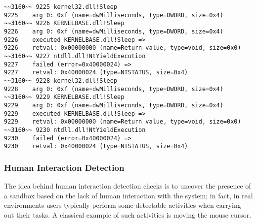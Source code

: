 \vspace{0.5cm}
\begin{lstlisting}[caption={Portion of \texttt{Sleep} loop },captionpos=b]
~~3160~~ 9225 kernel32.dll!Sleep
9225 	arg 0: 0xf (name=dwMilliseconds, type=DWORD, size=0x4)
~~3160~~ 9226 KERNELBASE.dll!Sleep
9226 	arg 0: 0xf (name=dwMilliseconds, type=DWORD, size=0x4)
9226    executed KERNELBASE.dll!Sleep =>
9226 	retval: 0x00000000 (name=Return value, type=void, size=0x0)
~~3160~~ 9227 ntdll.dll!NtYieldExecution
9227    failed (error=0x40000024) =>
9227 	retval: 0x40000024 (type=NTSTATUS, size=0x4)
~~3160~~ 9228 kernel32.dll!Sleep
9228 	arg 0: 0xf (name=dwMilliseconds, type=DWORD, size=0x4)
~~3160~~ 9229 KERNELBASE.dll!Sleep
9229 	arg 0: 0xf (name=dwMilliseconds, type=DWORD, size=0x4)
9229    executed KERNELBASE.dll!Sleep =>
9229 	retval: 0x00000000 (name=Return value, type=void, size=0x0)
~~3160~~ 9230 ntdll.dll!NtYieldExecution
9230    failed (error=0x40000024) =>
9230 	retval: 0x40000024 (type=NTSTATUS, size=0x4)
\end{lstlisting}

\subsubsection*{Human Interaction Detection}

The idea behind human interaction detection checks is to uncover the presence of a sandbox based on the lack of human interaction with the system; in fact, in real environments users typically perform some detectable activities when carrying out their tasks. A classical example of such activities is moving the mouse cursor.  

